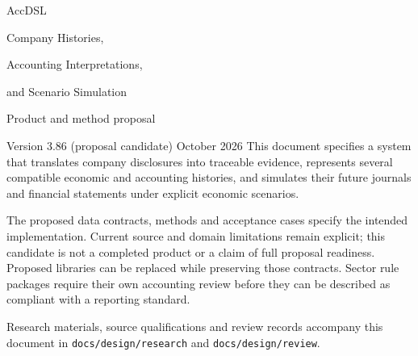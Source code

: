 \documentclass[11pt,a4paper]{report}
\newcommand{\code}[1]{\texttt{#1}}
\begin{document}
\hypersetup{pageanchor=false}
\begin{titlepage}
\vspace*{20mm}
{\sffamily\color{ink}\Huge AccDSL\par}
\vspace{7mm}
{\LARGE Company Histories,\par Accounting Interpretations,\par and Scenario Simulation\par}
\vspace{12mm}
{\Large Product and method proposal\par}
\vspace{5mm}
Version 3.86 (proposal candidate)  October 2026
\vfill
This document specifies a system that translates company disclosures into
traceable evidence, represents several compatible economic and accounting
histories, and simulates their future journals and financial statements under
explicit economic scenarios.

The proposed data contracts, methods and acceptance cases specify the intended
implementation. Current source and domain limitations remain explicit; this
candidate is not a completed product or a claim of full proposal readiness. Proposed libraries can be replaced while preserving those
contracts. Sector rule packages require their own accounting review before
they can be described as compliant with a reporting standard.

\vspace{8mm}
Research materials, source qualifications and review records accompany this
document in \code{docs/design/research} and \code{docs/design/review}.
\end{titlepage}
\hypersetup{pageanchor=true}
\tableofcontents
\clearpage{}














\appendix




\begingroup\raggedright

\endgroup
\end{document}
